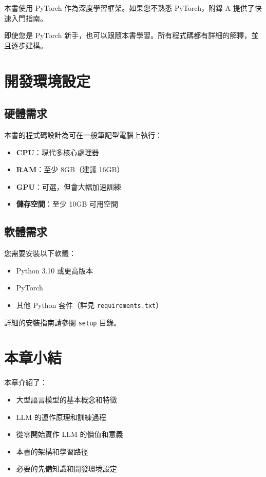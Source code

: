本書使用 PyTorch 作為深度學習框架。如果您不熟悉 PyTorch，附錄 A 提供了快速入門指南。

\begin{remark}
即使您是 PyTorch 新手，也可以跟隨本書學習。所有程式碼都有詳細的解釋，並且逐步建構。
\end{remark}

\section{開發環境設定}

\subsection{硬體需求}

本書的程式碼設計為可在一般筆記型電腦上執行：

\begin{itemize}
    \item \textbf{CPU}：現代多核心處理器
    \item \textbf{RAM}：至少 8GB（建議 16GB）
    \item \textbf{GPU}：可選，但會大幅加速訓練
    \item \textbf{儲存空間}：至少 10GB 可用空間
\end{itemize}

\subsection{軟體需求}

您需要安裝以下軟體：

\begin{itemize}
    \item Python 3.10 或更高版本
    \item PyTorch
    \item 其他 Python 套件（詳見 \texttt{requirements.txt}）
\end{itemize}

詳細的安裝指南請參閱 \texttt{setup} 目錄。

\section{本章小結}

本章介紹了：

\begin{itemize}
    \item 大型語言模型的基本概念和特徵
    \item LLM 的運作原理和訓練過程
    \item 從零開始實作 LLM 的價值和意義
    \item 本書的架構和學習路徑
    \item 必要的先備知識和開發環境設定
\end{itemize}


